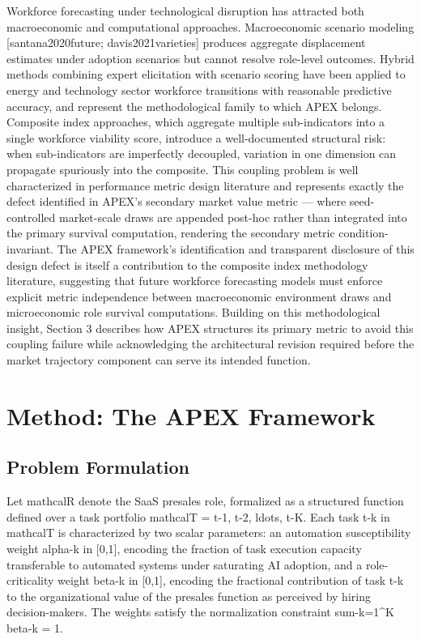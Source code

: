 \documentclass[10pt, conference]{IEEEtran}
\begin{document}
Workforce forecasting under technological disruption has attracted both macroeconomic and computational approaches. Macroeconomic scenario modeling [santana2020future; davis2021varieties] produces aggregate displacement estimates under adoption scenarios but cannot resolve role-level outcomes. Hybrid methods combining expert elicitation with scenario scoring \cite{wiser2021expert} have been applied to energy and technology sector workforce transitions with reasonable predictive accuracy, and represent the methodological family to which APEX belongs. Composite index approaches, which aggregate multiple sub-indicators into a single workforce viability score, introduce a well-documented structural risk: when sub-indicators are imperfectly decoupled, variation in one dimension can propagate spuriously into the composite. This coupling problem is well characterized in performance metric design literature \cite{virtanen2020scipy} and represents exactly the defect identified in APEX's secondary market value metric --- where seed-controlled market-scale draws are appended post-hoc rather than integrated into the primary survival computation, rendering the secondary metric condition-invariant. The APEX framework's identification and transparent disclosure of this design defect is itself a contribution to the composite index methodology literature, suggesting that future workforce forecasting models must enforce explicit metric independence between macroeconomic environment draws and microeconomic role survival computations. Building on this methodological insight, Section 3 describes how APEX structures its primary metric to avoid this coupling failure while acknowledging the architectural revision required before the market trajectory component can serve its intended function.

\section{Method: The APEX Framework}

\label{sec:method_the_apex_framework}

\subsection{Problem Formulation}

\label{sec:problem_formulation}

Let mathcalR denote the SaaS presales role, formalized as a structured function defined over a task portfolio mathcalT = t-1, t-2, ldots, t-K. Each task t-k in mathcalT is characterized by two scalar parameters: an automation susceptibility weight alpha-k in [0,1], encoding the fraction of task execution capacity transferable to automated systems under saturating AI adoption, and a role-criticality weight beta-k in [0,1], encoding the fractional contribution of task t-k to the organizational value of the presales function as perceived by hiring decision-makers. The weights satisfy the normalization constraint sum-k=1^K beta-k = 1.
\end{document}
